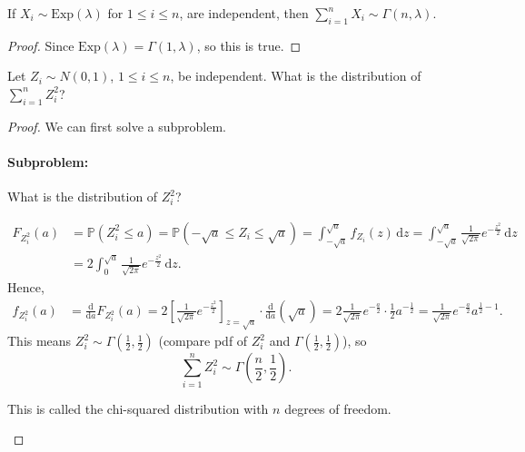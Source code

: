\begin{corollary}
    If \(X_i \sim \mathrm{Exp}(\lambda ) \) for \(1 \le i \le n\), are independent, then \(\sum_{i=1}^n X_i \sim \Gamma (n, \lambda) \).   
\end{corollary}
\begin{proof}
    Since \(\mathrm{Exp}(\lambda) = \Gamma (1, \lambda)\), so this is true. 
\end{proof}

\begin{eg}
    Let \(Z_i \sim N(0, 1)\), \(1 \le i \le n\), be independent. What is the distribution of \(\sum_{i=1}^n Z_i^2 \)?   
\end{eg}

\begin{proof}
    We can first solve a subproblem.
    \paragraph{Subproblem:} What is the distribution of \(Z_i^2\)?

    \begin{align*}
        F_{Z_i^2}(a) &= \mathbb{P} (Z_i^2 \le a) = \mathbb{P} (-\sqrt{a} \le Z_i \le \sqrt{a}) = \int _{-\sqrt{a} }^{\sqrt{a} } f_{Z_i}(z) \, \mathrm{d} z  = \int _{-\sqrt{a} }^{\sqrt{a} } \frac{1}{\sqrt{2 \pi } } e^{- \frac{z^2}{2}} \, \mathrm{d} z \\
        &= 2 \int _0^{\sqrt{a}} \frac{1}{\sqrt{2\pi } } e^{- \frac{z^2}{2}} \, \mathrm{d} z.   
    \end{align*} 
    Hence,
    \begin{align*}
        f_{Z_i^2}(a) &= \frac{\mathrm{d}}{\mathrm{d} a} F_{Z_i^2} (a) = 2 \left[ \frac{1}{\sqrt{2 \pi } } e^{- \frac{z^2}{2}} \right]_{z = \sqrt{a}} \cdot \frac{\mathrm{d}}{\mathrm{d}a} (\sqrt{a} ) = 2 \frac{1}{\sqrt{2 \pi }} e^{- \frac{a}{2}} \cdot \frac{1}{2} a^{-\frac{1}{2}} = \frac{1}{\sqrt{2 \pi }} e^{- \frac{a}{2}} a^{\frac{1}{2} - 1}.  
    \end{align*}
    This means \(Z_i^2 \sim \Gamma \left( \frac{1}{2}, \frac{1}{2} \right) \) (compare pdf of \(Z_i^2\) and \(\Gamma \left( \frac{1}{2}, \frac{1}{2} \right) \)), so 
    \[
        \sum_{i=1}^n Z_i^2 \sim \Gamma \left( \frac{n}{2}, \frac{1}{2} \right).  
    \] 
    \begin{remark}
        This is called the chi-squared distribution with \(n\) degrees of freedom. 
    \end{remark}
\end{proof}


